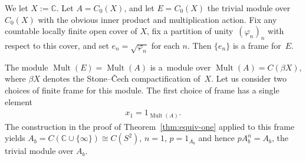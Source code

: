 \documentclass[10pt,a4paper]{amsart}
\numberwithin{equation}{section}
\DeclareMathOperator{\Mult}{Mult} %
\newcommand{\C}{\mathbb{C}} %
\begin{document}
\begin{Example}\label{ex:hopf-extends} We let $X := \C$. Let $A=C_0(X)$, and let $E=C_0(X)$ the trivial module over $C_0(X)$ with the obvious inner product and multiplication action. Fix any countable locally f\/inite open cover of $X$, f\/ix a partition of unity~$(\varphi_n)_n$ with respect to this cover, and set $e_n=\sqrt{\varphi_n}$ for each $n$. Then $\{e_n\}$ is a frame for~$E$.

The module $\Mult(E)=\Mult(A)$ is a~module over $\Mult(A)=C(\beta X)$, where $\beta X$ denotes the Stone--\v{C}ech compactif\/ication of~$X$. Let us consider two choices of f\/inite frame for this module. The f\/irst choice of frame has a single element
\begin{gather*}
x_1=1_{\Mult(A)}.
\end{gather*}
The construction in the proof of Theorem~\ref{thm:equiv-one} applied to this frame yields $A_b = C(\C \cup \{\infty\}) \cong C(S^2)$, $n = 1$, $p = 1_{A_b}$ and hence $p A_b^n = A_b$, the trivial module over $A_b$.


\end{Example}
\end{document}
